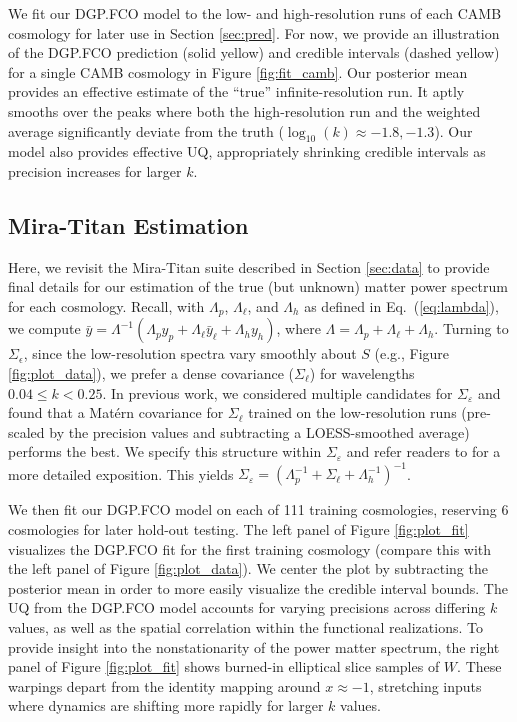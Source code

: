 \documentclass[11pt]{article}
\begin{document}
We fit our DGP.FCO model to the low- and high-resolution runs of each CAMB cosmology for
later use in Section \ref{sec:pred}.  For now, we provide an illustration of the DGP.FCO
prediction (solid yellow) and credible intervals (dashed yellow) for a single 
CAMB cosmology in Figure \ref{fig:fit_camb}.  Our posterior mean provides an effective estimate
of the ``true'' infinite-resolution run.  It aptly smooths over the peaks where 
both the high-resolution run and the weighted average significantly deviate from the truth
($\log_{10}(k)\approx -1.8,-1.3$). Our model also provides effective UQ, appropriately shrinking
credible intervals as precision increases for larger $k$.

\subsection{Mira-Titan Estimation}
\label{subsec:mira_fit}

Here, we revisit the Mira-Titan suite described in Section \ref{sec:data} to provide
final details for our estimation of the true (but unknown) matter power spectrum for
each cosmology.  Recall, with $\Lambda_p$, $\Lambda_\ell$, and $\Lambda_h$ as 
defined in Eq.~(\ref{eq:lambda}), we compute
$\bar y = \Lambda^{-1}(\Lambda_p y_p + \Lambda_{\ell} \bar{y}_\ell + \Lambda_h y_h)$, 
where $\Lambda = \Lambda_p + \Lambda_\ell + \Lambda_h$.
Turning to $\Sigma_\epsilon$, since the low-resolution spectra 
vary smoothly about $S$ (e.g., Figure \ref{fig:plot_data}), we prefer a dense 
covariance ($\Sigma_\ell$) for wavelengths $0.04 \leq k < 0.25$.
In previous work, we considered multiple candidates for 
$\Sigma_\varepsilon$ \citep{walsh2023bayesian} and found that a Mat\'ern covariance 
for $\Sigma_\ell$ trained on the low-resolution runs (pre-scaled by the precision 
values and subtracting a LOESS-smoothed average) performs the best. 
We specify this structure within $\Sigma_\varepsilon$ and refer readers 
to \cite{walsh2023bayesian} for a more detailed exposition. This yields 
$\Sigma_\varepsilon=\left(\Lambda_p^{-1} + \Sigma_\ell + \Lambda_h^{-1}\right)^{-1}$.

We then fit our DGP.FCO model on each of 111 training cosmologies, reserving 6 cosmologies
for later hold-out testing.  The left panel of Figure \ref{fig:plot_fit} 
visualizes the DGP.FCO fit for the first training cosmology (compare this with the left
panel of Figure \ref{fig:plot_data}).  We center the plot
by subtracting the posterior mean in order to more easily visualize the credible
interval bounds.  The UQ from the DGP.FCO model accounts for varying precisions 
across differing $k$ values, as well as the spatial correlation within the 
functional realizations.  To provide insight into the nonstationarity of the power
matter spectrum, the right panel of Figure \ref{fig:plot_fit} shows burned-in elliptical 
slice samples of $W$.
These warpings depart from the identity mapping around $x\approx-1$, 
stretching inputs where dynamics are shifting more rapidly for larger $k$ values.
\end{document}
